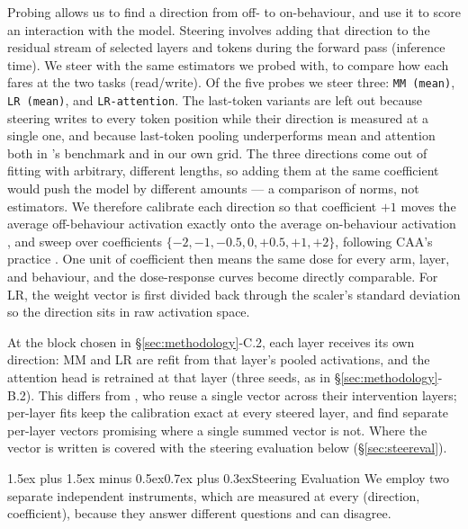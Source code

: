 \documentclass[conference]{IEEEtran}
\makeatletter
\renewcommand{\subsubsection}{\@startsection{subsubsection}{3}{1em}%
  {1.5ex plus 1.5ex minus 0.5ex}{0.7ex plus 0.3ex}{\normalfont\normalsize\itshape}}
\makeatother
\begin{document}
Probing allows us to find a direction from off- to on-behaviour, and use it to
score an interaction with the model. Steering involves adding that direction to
the residual stream of selected layers and tokens during the forward pass
(inference time). We steer with the same estimators we probed with, to compare
how each fares at the two tasks (read/write). Of the five probes we steer
three: \texttt{MM (mean)}, \texttt{LR (mean)}, and \texttt{LR-attention}. The
last-token variants are left out because steering writes to every token
position while their direction is measured at a single one, and because
last-token pooling underperforms mean and attention both in
\citeauthor{mckenzie2025}'s benchmark and in our own grid. The three directions
come out of fitting with arbitrary, different lengths, so adding them at the
same coefficient would push the model by different amounts --- a comparison of
norms, not estimators. We therefore calibrate each direction so that
coefficient $+1$ moves the average off-behaviour activation exactly onto the
average on-behaviour activation \citep{marks2024}, and sweep over coefficients
$\{-2, -1, -0.5, 0, +0.5, +1, +2\}$, following CAA's practice
\citep{rimsky2024}. One unit of coefficient then
means the same dose for every arm, layer, and behaviour, and the dose-response
curves become directly comparable. For LR, the weight vector is first divided
back through the scaler's standard deviation so the direction sits in raw
activation space.

At the block chosen in §\ref{sec:methodology}-C.2, each layer receives its own
direction: MM and LR are refit from that layer's pooled activations, and the
attention head is retrained at that layer (three seeds, as in
§\ref{sec:methodology}-B.2). This differs from \citeauthor{marks2024}, who
reuse a single vector across their intervention layers; per-layer fits keep the
calibration exact at every steered layer, and \citet{vanderweij2024} find
separate per-layer vectors promising where a single summed vector is not.
Where the vector is written is covered with the steering evaluation below
(§\ref{sec:steereval}).

\subsubsection{Steering Evaluation}
\label{sec:steereval}
We employ two separate independent instruments, which are measured at every
(direction, coefficient), because they answer different questions and can
disagree.
\end{document}
